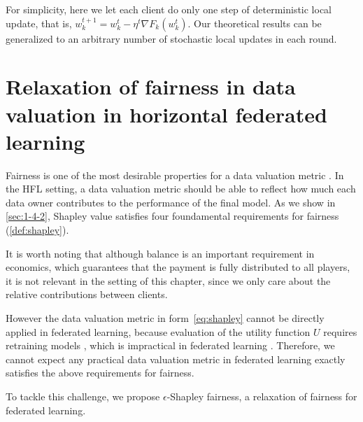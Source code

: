 For simplicity, here we let each client do only one step of deterministic local update, that is, $w_k^{t+1} = w_k^t - \eta^t \nabla F_k(w_k^t)$. Our theoretical results can be generalized to an arbitrary number of stochastic local updates in each round. 

\section{Relaxation of fairness in data valuation in horizontal federated learning} \label{sec:7-4}

Fairness is one of the most desirable properties for a data valuation metric \citep{ghorbani2019data,pei2020survey}. In the HFL setting, a data valuation metric should be able to reflect how much each data owner contributes to the performance of the final model. As we show in \autoref{sec:1-4-2}, Shapley value satisfies four foundamental requirements for fairness (\autoref{def:shapley}). 

It is worth noting that although balance is an important requirement in economics, which guarantees that the payment is fully distributed to all players, it is not relevant in the setting of this chapter, since we only care about the relative contributions between clients. 

However the data valuation metric in form~\eqref{eq:shapley} cannot be directly applied in federated learning, because evaluation of the utility function $U$ requires retraining models \citep{ghorbani2019data}, which is impractical in federated learning \citep{wang2020principled}. Therefore, we cannot expect any practical data valuation metric in federated learning exactly satisfies the above requirements for fairness.

To tackle this challenge, we propose $\epsilon$-Shapley fairness, a relaxation of fairness for federated learning.

